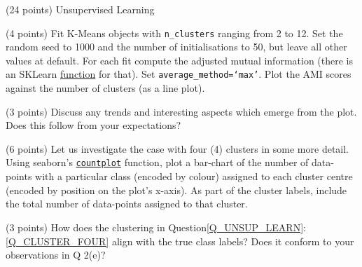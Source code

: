 \documentclass[12pt]{article}
\begin{document}
\begin{question}{\label{Q_UNSUP_LEARN}(24 points) Unsupervised Learning}
\begin{subquestion}{(4 points) Fit K-Means objects with \texttt{n\_clusters} ranging from 2 to 12. Set the random seed to 1000 and the number of initialisations to 50, but leave all other values at default. For each fit compute the adjusted mutual information (there is an SKLearn \href{https://scikit-learn.org/stable/modules/generated/sklearn.metrics.adjusted_mutual_info_score.html}{function} for that). Set \texttt{average\_method=`max'}. Plot the AMI scores against the number of clusters (as a line plot).}






\end{subquestion}

\begin{subquestion}{(3 points) Discuss any trends and interesting aspects which emerge from the plot. Does this follow from your expectations?}






\end{subquestion}

\begin{subquestion}{\label{Q_CLUSTER_FOUR}(6 points) Let us investigate the case with four (4) clusters in some more detail. Using seaborn's \href{https://seaborn.pydata.org/generated/seaborn.countplot.html}{\texttt{countplot}} function, plot a bar-chart of the number of data-points with a particular class (encoded by colour) assigned to each cluster centre (encoded by position on the plot's x-axis). As part of the cluster labels, include the total number of data-points assigned to that cluster.}






\end{subquestion}

\begin{subquestion}{(3 points) How does the clustering in Question\ref{Q_UNSUP_LEARN}:\ref{Q_CLUSTER_FOUR} align with the true class labels? Does it conform to your observations in Q 2(e)?}






\end{subquestion}



\end{question}
\end{document}
